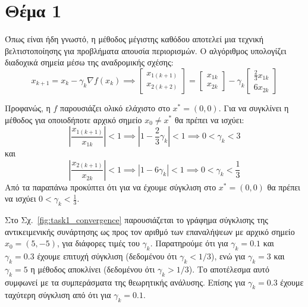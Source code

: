\documentclass[a4paper,12pt]{article}
\begin{document}
\section*{Θέμα 1}
Όπως είναι ήδη γνωστό, η μέθοδος μέγιστης καθόδου αποτελεί μια τεχνική βελτιστοποίησης για προβλήματα απουσία 
περιορισμών. Ο αλγόριθμος υπολογίζει διαδοχικά σημεία μέσω της αναδρομικής σχέσης: 
\[
x_{k+1} = x_k - \gamma_k \nabla f(x_k) \implies 
\begin{bmatrix} x_{1(k+1)} \\ x_{2(k+2)} \end{bmatrix} = 
\begin{bmatrix} x_{1k} \\ x_{2k} \end{bmatrix}
 - \gamma_k \begin{bmatrix} \frac{2}{3} x_{1k} \\ 6 x_{2k} \end{bmatrix}
\]

Προφανώς, η $f$ παρουσιάζει ολικό ελάχιστο στο $x^* = (0,0)$. Για να συγκλίνει η μέθοδος για οποιοδήποτε αρχικό
σημείο $x_0 \neq x^*$ θα πρέπει να ισχύει:
\[
\left|\frac{x_{1(k+1)}}{x_{1k}}\right| < 1 \implies \left|1 - \frac{2}{3} \gamma_k \right| < 1 
\implies 0 < \gamma_k < 3
\]
και
\[
\left|\frac{x_{2(k+1)}}{x_{2k}}\right| < 1 \implies \left|1 - 6 \gamma_k \right| < 1 
\implies 0 < \gamma_k < \frac{1}{3}
\]
Από τα παραπάνω προκύπτει ότι για να έχουμε σύγκλιση στο $x^* = (0,0)$ θα πρέπει να ισχύει $0 < \gamma_k < \frac{1}{3}$.

Στο Σχ.~\ref{fig:task1_convergence} παρουσιάζεται το γράφημα σύγκλισης της αντικειμενικής συνάρτησης ως προς τον αριθμό 
των επαναλήψεων με αρχικό σημείο $x_0 = (5, -5)$, για διάφορες τιμές του $\gamma_k$. Παρατηρούμε ότι για $\gamma_k = 0.1$ 
και $\gamma_k = 0.3$ έχουμε επιτυχή σύγκλιση (δεδομένου ότι $\gamma_k < 1/3$), ενώ για $\gamma_k = 3$ και $\gamma_k = 5$
η μέθοδος αποκλίνει (δεδομένου ότι $\gamma_k > 1/3$). Το αποτέλεσμα αυτό συμφωνεί με τα συμπεράσματα της θεωρητικής 
ανάλυσης. Επίσης για $\gamma_k = 0.3$ έχουμε ταχύτερη σύγκλιση από ότι για $\gamma_k = 0.1$.
\end{document}
